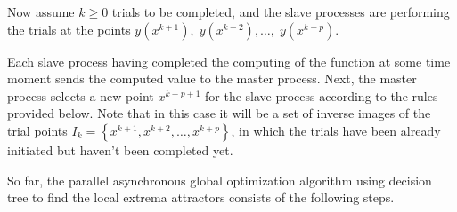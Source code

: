 \documentclass{svproc}
\begin{document}
Now assume $k\geq0$ trials to be completed, and the slave processes are performing the trials at the points $y\left(x^{k+1}\right),\;y\left(x^{k+2}\right),\ldots,\;y\left(x^{k+p}\right)$.

Each slave process having completed the computing of the function at some time moment sends  the computed value to the master process. Next, the master process selects a new point  $x^{k+p+1}$ for the slave process according to the rules provided below. Note that in this case it will be a set of inverse images of the trial points  $I_k=\left\{x^{k+1},x^{k+2},\ldots,x^{k+p}\right\}$, in which the trials have been already initiated but haven't been completed yet.

So far, the parallel asynchronous global optimization algorithm using decision tree to find the local  extrema attractors consists of the following steps.
\end{document}
